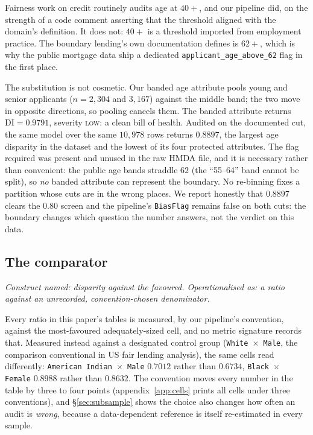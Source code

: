 \documentclass[sigconf,nonacm]{acmart}
\begin{document}
Fairness work on credit routinely audits age at $40{+}$, and our pipeline did,
on the strength of a code comment asserting that the threshold aligned with
the domain's definition. It does not: $40{+}$ is a threshold imported from
employment practice. The boundary lending's own documentation defines is
$62{+}$, which is why the public mortgage data ship a dedicated
\texttt{applicant\_age\_above\_62} flag in the first place.

The substitution is not cosmetic. Our banded age attribute pools young and
senior applicants ($n{=}2{,}304$ and $3{,}167$) against the middle band; the
two move in opposite directions, so pooling cancels them. The banded attribute
returns $\mathrm{DI}=0.9791$, severity \textsc{low}: a clean bill of
health. Audited on the documented cut, the same model over the same $10{,}978$
rows returns $0.8897$, the largest age disparity in the dataset and the lowest
of its four protected attributes. The flag required was present and unused in
the raw HMDA file, and it is necessary rather than convenient: the public age
bands straddle $62$ (the ``55--64'' band cannot be split), so \emph{no} banded
attribute can represent the boundary. No re-binning fixes a partition whose
cuts are in the wrong places. We report honestly that $0.8897$ clears the
$0.80$ screen and the pipeline's \texttt{BiasFlag} remains false on both cuts:
the boundary changes which question the number answers, not the verdict on
this data.

\subsection{The comparator}
\label{sec:reference}

\emph{Construct named: disparity against the favoured. Operationalised as: a
ratio against an unrecorded, convention-chosen denominator.}

Every ratio in this paper's tables is measured, by our pipeline's convention,
against the most-favoured adequately-sized cell, and no metric signature
records that. Measured instead against a designated control group
(\texttt{White $\times$ Male}, the comparison conventional in US fair lending
analysis), the same cells read differently: \texttt{American Indian $\times$
Male} $0.7012$ rather than $0.6734$, \texttt{Black $\times$ Female} $0.8988$
rather than $0.8632$. The convention moves every number in the table by three
to four points (appendix~\ref{app:cells} prints all cells under three
conventions), and \S\ref{sec:subsample} shows the choice also changes how
often an audit is \emph{wrong}, because a data-dependent reference is itself
re-estimated in every sample.
\end{document}

